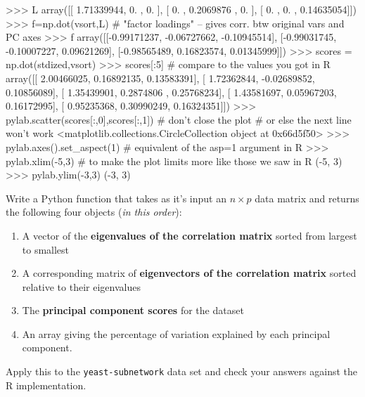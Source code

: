\begin{python}
>>> L
array([[ 1.71339944,  0.        ,  0.        ],
       [ 0.        ,  0.2069876 ,  0.        ],
       [ 0.        ,  0.        ,  0.14635054]])
>>> f=np.dot(vsort,L) # "factor loadings" -- gives corr. btw original vars and PC axes
>>> f
array([[-0.99171237, -0.06727662, -0.10945514],
       [-0.99031745, -0.10007227,  0.09621269],
       [-0.98565489,  0.16823574,  0.01345999]])
>>> scores = np.dot(stdized,vsort)
>>> scores[:5]  # compare to the values you got in R
array([[ 2.00466025,  0.16892135,  0.13583391],
       [ 1.72362844, -0.02689852,  0.10856089],
       [ 1.35439901,  0.2874806 ,  0.25768234],
       [ 1.43581697,  0.05967203,  0.16172995],
       [ 0.95235368,  0.30990249,  0.16324351]])
>>> pylab.scatter(scores[:,0],scores[:,1]) # don't close the plot 
                                        # or else the next line won't work
<matplotlib.collections.CircleCollection object at 0x66d5f50>
>>> pylab.axes().set_aspect(1) # equivalent of the asp=1 argument in R
>>> pylab.xlim(-5,3)  # to make the plot limits more like those we saw in R
(-5, 3)
>>> pylab.ylim(-3,3)
(-3, 3)
\end{python}

\begin{assignment}
Write a Python function that takes as it's input
an $n \times p$ data matrix and returns the following four objects
(\emph{in this order}):

\begin{enumerate}[1.]
\item
  A vector of the \textbf{eigenvalues of the correlation matrix} sorted
  from largest to smallest
\item
  A corresponding matrix of \textbf{eigenvectors of the correlation
  matrix} sorted relative to their eigenvalues
\item
  The \textbf{principal component scores} for the dataset
\item
  An array giving the percentage of variation explained by each
  principal component.
\end{enumerate}

Apply this to the \lstinline!yeast-subnetwork! data set and check your
answers against the R implementation.

\end{assignment}
